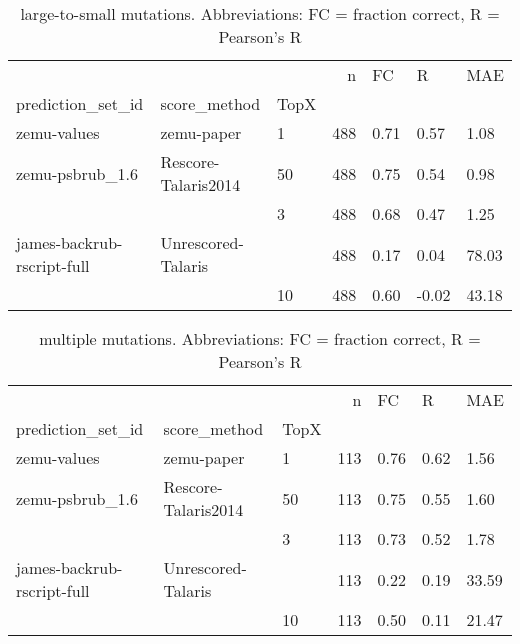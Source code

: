 \documentclass[10pt, letterpaper, oneside, titlepage, landscape]{scrreprt}
\begin{document}
\begin{table}[H]
\begin{tabular}{lllrlll}
\toprule
                           &                     &    &    n &    FC &      R &    MAE \\
prediction\_set\_id & score\_method & TopX &      &       &        &        \\
\midrule
zemu-values & zemu-paper & 1  &  488 &  0.71 &   0.57 &   1.08 \\
zemu-psbrub\_1.6 & Rescore-Talaris2014 & 50 &  488 &  0.75 &   0.54 &   0.98 \\
                           &                     & 3  &  488 &  0.68 &   0.47 &   1.25 \\
james-backrub-rscript-full & Unrescored-Talaris &    &  488 &  0.17 &   0.04 &  78.03 \\
                           &                     & 10 &  488 &  0.60 &  -0.02 &  43.18 \\
\bottomrule
\end{tabular}
\caption{large-to-small mutations. Abbreviations: FC = fraction correct, R = Pearson's R}
\end{table}
\begin{table}[H]
\begin{tabular}{lllrlll}
\toprule
                           &                     &    &    n &    FC &     R &    MAE \\
prediction\_set\_id & score\_method & TopX &      &       &       &        \\
\midrule
zemu-values & zemu-paper & 1  &  113 &  0.76 &  0.62 &   1.56 \\
zemu-psbrub\_1.6 & Rescore-Talaris2014 & 50 &  113 &  0.75 &  0.55 &   1.60 \\
                           &                     & 3  &  113 &  0.73 &  0.52 &   1.78 \\
james-backrub-rscript-full & Unrescored-Talaris &    &  113 &  0.22 &  0.19 &  33.59 \\
                           &                     & 10 &  113 &  0.50 &  0.11 &  21.47 \\
\bottomrule
\end{tabular}
\caption{multiple mutations. Abbreviations: FC = fraction correct, R = Pearson's R}
\end{table}
\end{document}

